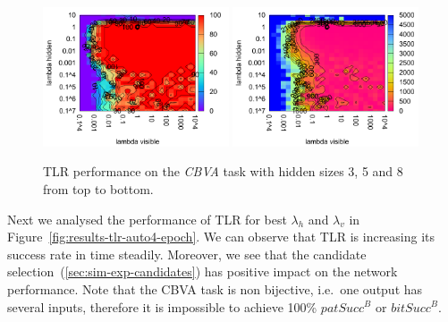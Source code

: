 \begin{figure}[H]
  \includegraphics[width=0.49\textwidth]{img/k3/tlr-8-success.pdf} 
  \includegraphics[width=0.49\textwidth]{img/k3/tlr-8-epoch.pdf}    
  \caption{TLR performance on the \emph{CBVA} task with hidden sizes 3, 5 and 8 from top to bottom.}
  \label{fig:results-tlr-k3-performance}
\end{figure}

Next we analysed the performance of TLR for best $\lambda_h$ and $\lambda_v$ in Figure~\ref{fig:results-tlr-auto4-epoch}. We can observe that TLR is increasing its success rate in time steadily. Moreover, we see that the candidate selection~(\ref{sec:sim-exp-candidates}) has positive impact on the network performance.
Note that the CBVA task is non bijective, i.e.~one output has several inputs, therefore it is impossible to achieve 100\% $patSucc^B$ or $bitSucc^B$. 

